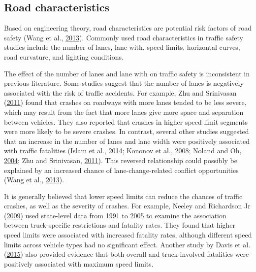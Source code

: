 \documentclass[12pt]{book}
\numberwithin{equation}{chapter}
\begin{document}
\hypertarget{road-characteristics}{%
\subsection{Road characteristics}\label{road-characteristics}}

Based on engineering theory, road characteristics are potential risk factors of road safety (Wang et al., \protect\hyperlink{ref-wang2013effect}{2013}). Commonly used road characteristics in traffic safety studies include the number of lanes, lane with, speed limits, horizontal curves, road curvature, and lighting conditions.

The effect of the number of lanes and lane with on traffic safety is inconsistent in previous literature. Some studies suggest that the number of lanes is negatively associated with the risk of traffic accidents. For example, Zhu and Srinivasan (\protect\hyperlink{ref-zhu2011comprehensive}{2011}) found that crashes on roadways with more lanes tended to be less severe, which may result from the fact that more lanes give more space and separation between vehicles. They also reported that crashes in higher speed limit segments were more likely to be severe crashes. In contrast, several other studies suggested that an increase in the number of lanes and lane width were positively associated with traffic fatalities (Islam et al., \protect\hyperlink{ref-islam2014comprehensive}{2014}; Kononov et al., \protect\hyperlink{ref-kononov2008relationships}{2008}; Noland and Oh, \protect\hyperlink{ref-noland2004effect}{2004}; Zhu and Srinivasan, \protect\hyperlink{ref-zhu2011comprehensive}{2011}). This reversed relationship could possibly be explained by an increased chance of lane-change-related conflict opportunities (Wang et al., \protect\hyperlink{ref-wang2013effect}{2013}).

It is generally believed that lower speed limits can reduce the chances of traffic crashes, as well as the severity of crashes. For example, Neeley and Richardson Jr (\protect\hyperlink{ref-neeley2009effect}{2009}) used state-level data from 1991 to 2005 to examine the association between truck-specific restrictions and fatality rates. They found that higher speed limits were associated with increased fatality rates, although different speed limits across vehicle types had no significant effect. Another study by Davis et al. (\protect\hyperlink{ref-davis2015longitudinal}{2015}) also provided evidence that both overall and truck-involved fatalities were positively associated with maximum speed limits.
\end{document}
